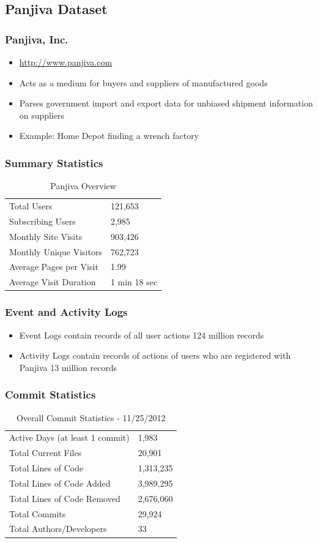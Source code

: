 \documentclass[xcolor=pdftex,dvipsnames,table]{beamer}
\begin{document}
\subsection{Panjiva Dataset}

\frame{\tableofcontents[currentsubsection]}

\frame
{
    \frametitle{Panjiva, Inc.}
    \begin{itemize}
        \item \url{http://www.panjiva.com}
        \item Acts as a medium for buyers and suppliers of manufactured goods
        \item Parses government import and export data for unbiased shipment information on suppliers
        \item Example: Home Depot finding a wrench factory
    \end{itemize}
}

\frame
{
    \frametitle{Summary Statistics}
    \begin{table}[h!]
    \centering
    \caption{Panjiva Overview}
    \begin{tabular}{l || l}
    \hline
    Total Users & 121,653 \\
    Subscribing Users & 2,985 \\
    Monthly Site Visits & 903,426 \\
    Monthly Unique Visitors & 762,723 \\
    Average Pages per Visit & 1.99 \\
    Average Visit Duration & 1 min 18 sec \\
    \hline
    \end{tabular}
    \label{table:panjiva-overview}
    \end{table}
}

\frame
{
    \frametitle{Event and Activity Logs}
    \begin{itemize}
        \item Event Logs contain records of all user actions 124 million records
        \item Activity Logs contain records of actions of users who are registered with Panjiva 13 million records
    \end{itemize}
}

\frame
{
    \frametitle{Commit Statistics}
    \begin{table}[h!]
    \centering
    \caption{Overall Commit Statistics - 11/25/2012}
    \begin{tabular}{l || l }
    \hline
    Active Days (at least 1 commit) & 1,983 \\
    Total Current Files & 20,901 \\
    Total Lines of Code & 1,313,235 \\
    Total Lines of Code Added & 3,989,295 \\
    Total Lines of Code Removed & 2,676,060 \\
    Total Commits & 29,924 \\
    Total Authors/Developers & 33 \\
    \hline
    \end{tabular}
    \label{table:commit-stats}
    \end{table}
} 
\end{document}
